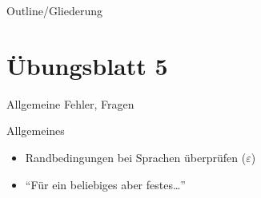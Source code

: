 
\subtitle{Foliensatz 6}
\date{29. November 2012}



\begin{frame}
    \titlepage
\end{frame}

\begin{frame}{Outline/Gliederung}
    \tableofcontents
\end{frame}

\section{Übungsblatt 5}
\begin{frame}{Allgemeine Fehler, Fragen}
    \begin{block}{Allgemeines}
        \begin{itemize}
            \item Randbedingungen bei Sprachen überprüfen ($\varepsilon$)
            \item ``Für ein beliebiges aber festes\dots ''
        \end{itemize}
    \end{block}
\end{frame}

